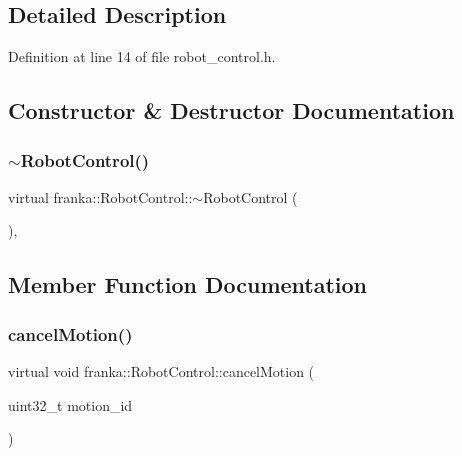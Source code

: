 \subsection{Detailed Description}


Definition at line 14 of file robot\+\_\+control.\+h.



\subsection{Constructor \& Destructor Documentation}
\mbox{\label{classfranka_1_1RobotControl_a4a79e68d1a4cb81377b08ed3d377f5f7}} 
\subsubsection{\texorpdfstring{$\sim$\+Robot\+Control()}{~RobotControl()}}
{\footnotesize\ttfamily virtual franka\+::\+Robot\+Control\+::$\sim$\+Robot\+Control (\begin{DoxyParamCaption}{ }\end{DoxyParamCaption})\hspace{0.3cm}{\ttfamily [virtual]}, {\ttfamily [default]}}



\subsection{Member Function Documentation}
\mbox{\label{classfranka_1_1RobotControl_a8eb19b5e21e2ac8d9c98bffe2dd9124d}} 
\subsubsection{\texorpdfstring{cancel\+Motion()}{cancelMotion()}}
{\footnotesize\ttfamily virtual void franka\+::\+Robot\+Control\+::cancel\+Motion (\begin{DoxyParamCaption}\item[{uint32\+\_\+t}]{motion\+\_\+id }\end{DoxyParamCaption})\hspace{0.3cm}{\ttfamily [pure virtual]}}



